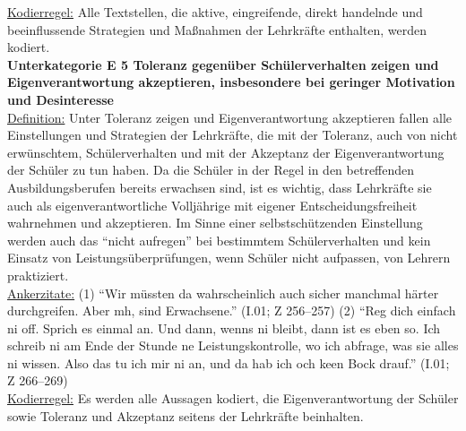 \underline{Kodierregel:} Alle Textstellen, die aktive, eingreifende, direkt handelnde und beeinflussende Strategien und Maßnahmen der Lehrkräfte enthalten, werden kodiert.\\

\noindent
\textbf{Unterkategorie E 5 Toleranz gegenüber Schülerverhalten zeigen und Eigenverantwortung akzeptieren, insbesondere bei geringer Motivation und Desinteresse}\\
\underline{Definition:} Unter Toleranz zeigen und Eigenverantwortung akzeptieren fallen alle Einstellungen und Strategien der Lehrkräfte, die mit der Toleranz, auch von nicht erwünschtem, Schülerverhalten und mit der Akzeptanz der Eigenverantwortung der Schüler zu tun haben. Da die Schüler in der Regel in den betreffenden Ausbildungsberufen bereits erwachsen sind, ist es wichtig, dass Lehrkräfte sie auch als eigenverantwortliche Volljährige mit eigener Entscheidungsfreiheit wahrnehmen und akzeptieren. Im Sinne einer selbstschützenden Einstellung werden auch das "`nicht aufregen"' bei bestimmtem Schülerverhalten und kein Einsatz von Leistungsüberprüfungen, wenn Schüler nicht aufpassen, von Lehrern praktiziert.\\
\underline{Ankerzitate:} (1) "`Wir müssten da wahrscheinlich auch sicher manchmal härter durchgreifen. Aber mh, sind Erwachsene."' (I.01; Z 256--257) (2) "`Reg dich einfach ni off. Sprich es einmal an. Und dann, wenns ni bleibt, dann ist es eben so. Ich schreib ni am Ende der Stunde ne Leistungskontrolle, wo ich abfrage, was sie alles ni wissen. Also das tu ich mir ni an, und da hab ich och keen Bock drauf."' (I.01; Z 266--269)\\
\underline{Kodierregel:} Es werden alle Aussagen kodiert, die Eigenverantwortung der Schüler sowie Toleranz und Akzeptanz seitens der Lehrkräfte beinhalten.\\

